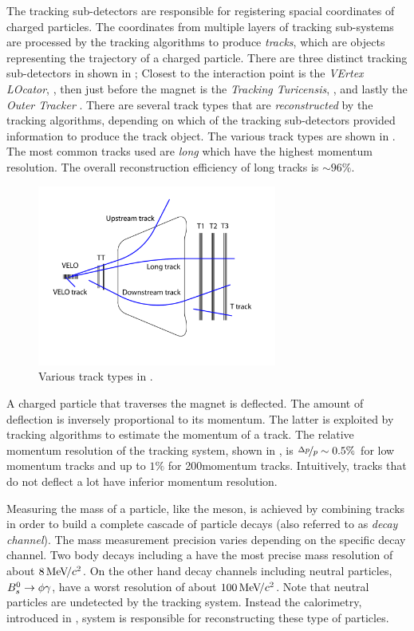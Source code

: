 The tracking sub-detectors are responsible for registering spacial coordinates of charged particles.
The coordinates from multiple layers of tracking sub-systems are processed by the tracking algorithms
to produce {\it tracks}, which are objects representing the trajectory of a charged particle. There are
three distinct tracking sub-detectors in \lhcb shown in ; Closest to the interaction point is
the {\it VErtex LOcator}, \velo, then just before the \lhcb magnet is the {\it Tracking Turicensis}, \ttracker,
and  lastly the {\it Outer Tracker} \ot. There are several track types that are {\it reconstructed} by
the tracking algorithms, depending on which of the tracking sub-detectors provided information to produce
the track object. The various track types are shown in . The most common tracks used are {\it long}
which have the highest momentum resolution. The overall reconstruction efficiency of long tracks is $\sim 96\%$.

\begin{figure}[t]
  \centering
  \includegraphics[width=0.7\textwidth]{Figures/Chapter2/trackTypesRunIAndII}
  \caption{Various track types in \lhcb.}
  \label{track_types}
\end{figure}

A charged particle that traverses the \lhcb magnet is deflected. The amount of deflection is inversely proportional
to its momentum. The latter is exploited by tracking algorithms to estimate the momentum of a track. The relative
momentum resolution of the tracking system, shown in , is $\nicefrac{\Delta p}{p} \sim 0.5 \%$
for low momentum tracks and up to $1\%$ for 200\gevc momentum tracks. Intuitively, tracks that do not deflect a
lot have inferior momentum resolution.

Measuring the mass of a particle, like the \Bs meson, is achieved by combining tracks in order to build a complete
cascade of particle decays (also referred to as {\it decay channel}). The mass measurement precision varies depending
on the specific decay channel. Two body \B decays including a \jpsi have the most precise mass resolution of about
$8 {\mathrm{\,Me\kern -0.1em V\!/}c^2}$. On the other hand decay channels including neutral particles, \ie $B^0_s\rightarrow\phi\gamma$, have a worst resolution of
about $100 {\mathrm{\,Me\kern -0.1em V\!/}c^2}$. Note that neutral particles are undetected by the tracking system. Instead the calorimetry,
introduced in , system is responsible for reconstructing these type of particles.

